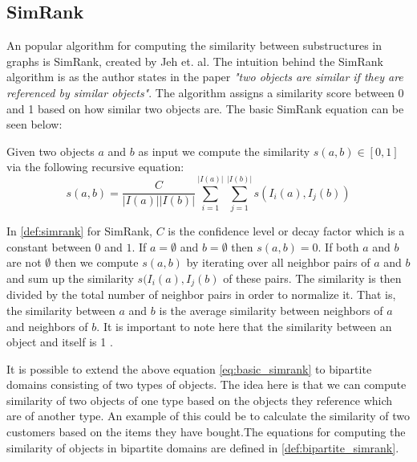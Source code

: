\subsection{SimRank}
An popular algorithm for computing the similarity between substructures in graphs is SimRank, created by Jeh et. al\cite{10.1145/775047.775126}. The intuition behind the SimRank algorithm is as the author states in the paper \emph{"two objects are similar if they are referenced by similar objects"}\cite{10.1145/775047.775126}. The algorithm assigns a similarity score between 0 and 1 based on how similar two objects are. The basic SimRank equation can be seen below:
\begin{definition}[SimRank]\label{def:simrank} Given two objects $a$ and $b$ as input we compute the similarity $s(a,b) \in [0,1]$ via the following recursive equation:
	\begin{equation}\label{eq:basic_simrank}
	s(a,b)= \frac{C}{|I(a)||I(b)|}\sum^{|I(a)|}_{i=1}\sum^{|I(b)|}_{j=1}s(I_i(a),I_j(b))
	\end{equation}
\end{definition}
In \autoref{def:simrank} for SimRank, $C$ is the confidence level or decay factor which is a constant between $0$ and $1$. If $a=\emptyset$ and $b= \emptyset$ then $s(a,b) = 0$. If both $a$ and $b$ are not $\emptyset$ then we compute $s(a,b)$ by iterating over all neighbor  pairs of $a$ and $b$ and sum up the similarity $s(I_i(a),I_j(b)$ of these pairs. The similarity is then divided by the total number of neighbor pairs in order to normalize it. That is, the similarity between $a$ and $b$ is the average similarity between neighbors of $a$ and neighbors of $b$. It is important to note here that the similarity between an object and itself is 1 \cite{10.1145/775047.775126}.

It is possible to extend the above equation \ref{eq:basic_simrank} to bipartite domains consisting of two types of objects. The idea here is that we can compute similarity of two objects of one type based on the objects they reference which are of another type. An example of this could be to calculate the similarity of two customers based on the items they have bought\cite{10.1145/775047.775126}.The equations for computing the similarity of objects in bipartite domains are defined in \autoref{def:bipartite_simrank}.

